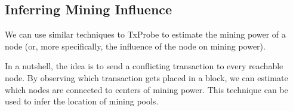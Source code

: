\subsection{Inferring Mining Influence}

We can use similar techniques to TxProbe to estimate the mining power of a node (or, more specifically, the influence of the node on mining power).

In a nutshell, the idea is to send a conflicting transaction to every reachable node. By observing which transaction gets placed in a block, we can estimate which nodes are connected to centers of mining power. This technique can be used to infer the location of mining pools.

